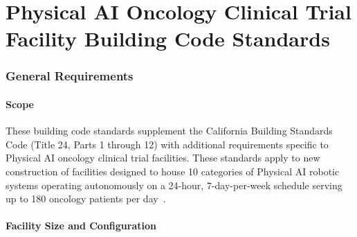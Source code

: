 

\part{Physical AI Oncology Clinical Trial Facility Building Code Standards}
\setcounter{section}{0}

\section{General Requirements}

\subsection{Scope}

These building code standards supplement the California Building Standards Code
(Title 24, Parts 1 through 12) with additional requirements specific to Physical
AI oncology clinical trial facilities. These standards apply to new construction
of facilities designed to house 10 categories of Physical AI robotic systems
operating autonomously on a 24-hour, 7-day-per-week schedule serving up to 180
oncology patients per day~\cite{sitespec2026}.

\subsection{Facility Size and Configuration}

